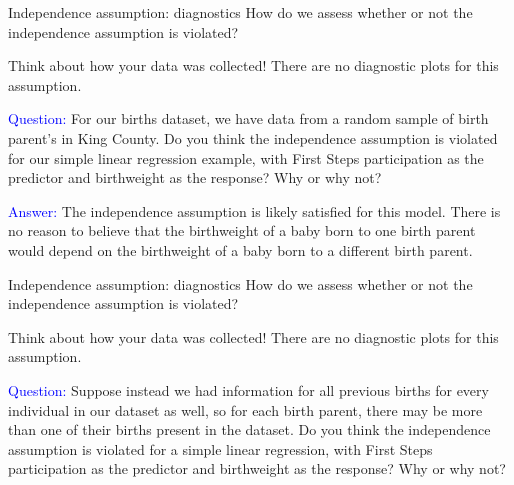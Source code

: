 \documentclass[10pt,t]{beamer}
\begin{document}
\begin{frame}{Independence assumption: diagnostics}
How do we assess whether or not the independence assumption is violated?

\vspace{0.3cm}

Think about how your data was collected! There are no diagnostic plots for this assumption.

\vspace{0.3cm}

\textcolor{blue}{Question:} For our births dataset, we have data from a random sample of birth parent's in King County. Do you think the independence assumption is violated for our simple linear regression example, with First Steps participation as the predictor and birthweight as the response? Why or why not?

\vspace{0.3cm}

\textcolor{blue}{Answer:} The independence assumption is likely satisfied for this model. There is no reason to believe that the birthweight of a baby born to one birth parent would depend on the birthweight of a baby born to a different birth parent.

\end{frame}

\begin{frame}{Independence assumption: diagnostics}
How do we assess whether or not the independence assumption is violated?

\vspace{0.3cm}

Think about how your data was collected! There are no diagnostic plots for this assumption.

\vspace{0.3cm}

\textcolor{blue}{Question:} Suppose instead we had information for all previous births for every individual in our dataset as well, so for each birth parent, there may be more than one of their births present in the dataset. Do you think the independence assumption is violated for a simple linear regression, with First Steps participation as the predictor and birthweight as the response? Why or why not?

\end{frame}
\end{document}
